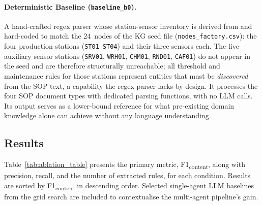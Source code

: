 ﻿\documentclass[11pt]{article}
\begin{document}
\paragraph{Deterministic Baseline (\texttt{baseline\_b0}).}
A hand-crafted regex parser whose station-sensor inventory is derived from
and hard-coded to match the 24~nodes of the KG seed file
(\texttt{nodes\_factory.csv}): the four production stations
(\texttt{ST01}--\texttt{ST04}) and their three sensors each.
The five auxiliary sensor stations (\texttt{SRV01}, \texttt{WRH01}, \texttt{CHM01},
\texttt{RND01}, \texttt{CAF01}) do not appear in the seed and are therefore
structurally unreachable; all threshold and maintenance rules for those stations
represent entities that must be \emph{discovered} from the SOP text, a capability
the regex parser lacks by design.
It processes the four SOP document types with dedicated parsing functions, with no
LLM calls.  Its output serves as a lower-bound reference for what pre-existing
domain knowledge alone can achieve without any language understanding.

\subsection{Results}
\label{sec:ablation_results}

Table~\ref{tab:ablation_table} presents the primary metric,
F1\textsubscript{content}, along with precision, recall, and the number of
extracted rules, for each condition. Results are sorted by
F1\textsubscript{content} in descending order. Selected single-agent LLM baselines
from the grid search are included to contextualise the multi-agent pipeline's gain.
\end{document}
